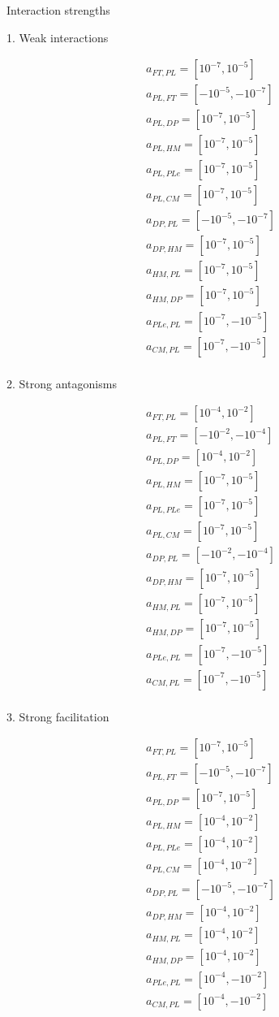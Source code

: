 Interaction strengths

1. Weak interactions

\begin{align*}
& a_{FT,PL} = [10^{-7},10^{-5}] \\
& a_{PL,FT} = [-10^{-5},-10^{-7}] \\
& a_{PL,DP} = [10^{-7},10^{-5}] \\
& a_{PL,HM} = [10^{-7},10^{-5}] \\
& a_{PL,PLe} = [10^{-7},10^{-5}] \\
& a_{PL,CM} = [10^{-7},10^{-5}] & \\
& a_{DP,PL} = [-10^{-5},-10^{-7}] \\
& a_{DP,HM} = [10^{-7},10^{-5}] \\
& a_{HM,PL} = [10^{-7},10^{-5}] \\
& a_{HM,DP} = [10^{-7},10^{-5}] \\
& a_{PLe,PL} = [10^{-7},-10^{-5}] \\
& a_{CM,PL} = [10^{-7},-10^{-5}] \\
\end{align*}

2. Strong antagonisms

\begin{align*}
& a_{FT,PL} = [10^{-4},10^{-2}] \\
& a_{PL,FT} = [-10^{-2},-10^{-4}] \\
& a_{PL,DP} = [10^{-4},10^{-2}] \\
& a_{PL,HM} = [10^{-7},10^{-5}] \\
& a_{PL,PLe} = [10^{-7},10^{-5}] \\
& a_{PL,CM} = [10^{-7},10^{-5}] & \\
& a_{DP,PL} = [-10^{-2},-10^{-4}] \\
& a_{DP,HM} = [10^{-7},10^{-5}] \\
& a_{HM,PL} = [10^{-7},10^{-5}] \\
& a_{HM,DP} = [10^{-7},10^{-5}] \\
& a_{PLe,PL} = [10^{-7},-10^{-5}] \\
& a_{CM,PL} = [10^{-7},-10^{-5}] \\
\end{align*}

3. Strong facilitation

\begin{align*}
& a_{FT,PL} = [10^{-7},10^{-5}] \\
& a_{PL,FT} = [-10^{-5},-10^{-7}] \\
& a_{PL,DP} = [10^{-7},10^{-5}] \\
& a_{PL,HM} = [10^{-4},10^{-2}] \\
& a_{PL,PLe} = [10^{-4},10^{-2}] \\
& a_{PL,CM} = [10^{-4},10^{-2}] & \\
& a_{DP,PL} = [-10^{-5},-10^{-7}] \\
& a_{DP,HM} = [10^{-4},10^{-2}] \\
& a_{HM,PL} = [10^{-4},10^{-2}] \\
& a_{HM,DP} = [10^{-4},10^{-2}] \\
& a_{PLe,PL} = [10^{-4},-10^{-2}] \\
& a_{CM,PL} = [10^{-4},-10^{-2}] \\
\end{align*}
